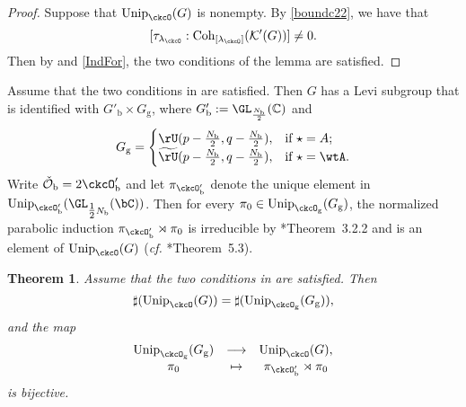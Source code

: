 \documentclass[12pt,a4paper]{amsart}
\newcommand{\CK}{{\mathcal {K}}}
\newcommand{\CO}{{\mathcal {O}}}
\newcommand{\be}{\begin {equation}}
\newcommand{\ee}{\end {equation}}
\numberwithin{equation}{section}
\newtheorem{thm}{Theorem}[section]
\theoremstyle{remark}
\def\half{{\tfrac{1}{2}}}
\def\cf{\emph{cf.} }
\def\Unip{\mathrm{Unip}}
\def\lamck{\lambda_\ckcO}
\def\Cint#1{\Coh_{[#1]}}
\def\LC{{}^{\scriptscriptstyle L}\sC}
\def\tU{\widetilde{\rU}}
\def\Coh{\mathrm{Coh}}
\def\ckcOpb{\ckcO'_{\mathrm b}}
\def\ckcOg{\ckcO_{\mathrm g}}
\def\Gg{G_{\mathrm g}}
\begin{document}
\begin{proof}
  Suppose that  $\Unip_{\ckcO}(G)$ is nonempty. By \eqref{boundc22}, we have that
  \[
  [\tau_{\lamck}:\Cint{\lamck}(\CK'(G))]\ne 0.
  \]
  Then  by  and \eqref{IndFor}, the two conditions of the lemma are satisfied.
  \end{proof}

Assume that the two conditions in  are satisfied. Then $G$ has a Levi subgroup that is identified with $G'_{\mathrm b}\times G_{\mathrm g}$, where
$G'_{\mathrm b}:=\GL_{\frac{N_{\mathrm b}}{2}}(\C)$ and
\[
  G_{\mathrm g} =
  \begin{cases}
    \rU(p-\frac{N_{\mathrm b}}{2},q-\frac{N_{\mathrm b}}{2}),  & \text{if }\star = A;\\
    \tU(p-\frac{N_{\mathrm b}}{2},q-\frac{N_{\mathrm b}}{2}),  & \text{if }\star = \wtA.
\end{cases}
\]
Write $\check \CO_{\mathrm b}=2 \ckcOpb$ and let $\pi_{\ckcOpb}$ denote the
unique element in $\Unip_{\ckcOpb}(\GL_{\half N_{\mathrm b}}(\bC))$. Then for
every $\pi_0\in \Unip_{\ckcO_{\mathrm g}}(\Gg)$, the normalized parabolic
induction $\pi_{\ckcOpb}\rtimes \pi_{0}$ is irreducible by
\cite{Mat96}*{Theorem~3.2.2} and is an element of $\Unip_{\ckcO}(G)$ (\cf
\cite{MR.U}*{Theorem~5.3}).

\begin{thm}
  Assume that the two conditions in  are satisfied.
  Then
  \begin{equation}\label{unitarred1}
    \sharp(\Unip_{\ckcO}(G)) =
    \sharp(\Unip_{\ckcO_{\mathrm g}}(\Gg)),
  \end{equation}
  and the map
  \begin{equation}
  \label{bij00}
    \begin{array}{ccc}
      \Unip_{\ckcOg}(\Gg)&\longrightarrow &\Unip_{\ckcO}(G),\\
      \pi_{0}& \mapsto & \pi_{\ckcOpb}\rtimes \pi_{0} \\
    \end{array}
  \end{equation}
  is bijective. %
\end{thm}
\end{document}
